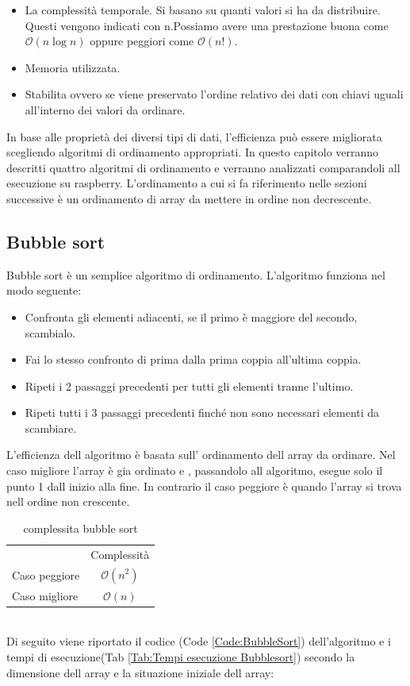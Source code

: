 \documentclass[12pt,a4paper]{report}
\begin{document}
\begin{itemize}
	\item La complessità temporale.  Si basano su quanti valori si ha da distribuire. Questi vengono indicati con n.Possiamo avere una prestazione buona come $\mathcal{O}(n\log{}n)$ oppure peggiori come $\mathcal{O}(n!)$.
	\item Memoria utilizzata.
	\item Stabilita ovvero se viene preservato l'ordine relativo dei dati con chiavi uguali all'interno dei valori da ordinare.
\end{itemize}

In base alle proprietà dei diversi tipi di dati, l'efficienza può essere migliorata scegliendo algoritmi di ordinamento appropriati. In questo capitolo verranno descritti quattro algoritmi di ordinamento e verranno analizzati comparandoli all esecuzione su raspberry. L'ordinamento a cui si fa riferimento nelle sezioni successive è un ordinamento di array da mettere in ordine non decrescente.

\subsection{Bubble sort}
Bubble sort è un semplice algoritmo di ordinamento. 
L'algoritmo funziona nel modo seguente:
\begin{itemize}
	\item Confronta gli elementi adiacenti, se il primo è maggiore del secondo, scambialo.
	\item Fai lo stesso confronto di prima dalla prima coppia all'ultima coppia. 
	\item Ripeti i 2 passaggi precedenti per tutti gli elementi tranne l'ultimo.
	\item Ripeti tutti i 3 passaggi precedenti finché non sono necessari elementi da scambiare.
\end{itemize}
L'efficienza dell algoritmo è basata sull' ordinamento dell array da ordinare. Nel caso migliore l'array è gia ordinato e , passandolo all algoritmo, esegue solo il punto 1 dall inizio alla fine. In contrario il caso peggiore è quando l'array si trova nell ordine non crescente.
\begin{table}[h]
	\centering
	\begin{tabular}{lc}
              & Complessità \\
Caso peggiore &       $ \mathcal{O}(n^2)$      \\
Caso migliore &           $ \mathcal{O}(n)$   \\
\end{tabular}
	\caption{complessita bubble sort}
	\label{Tab:CompBubbleSort}
\end{table}
\\
Di seguito viene riportato il codice (Code \ref{Code:BubbleSort}) dell'algoritmo e i tempi di esecuzione(Tab \ref{Tab:Tempi esecuzione Bubblesort}) secondo la dimensione dell array e la situazione iniziale dell array:
	
\end{document}
